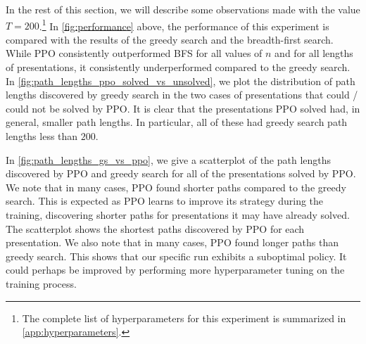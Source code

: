 In the rest of this section, we will describe some observations made with the value $T=200$.\footnote{The complete list of hyperparameters for this experiment is summarized in \autoref{app:hyperparameters}.}
In \autoref{fig:performance} above, the performance of this experiment is compared with the results of the greedy search and the breadth-first search. While PPO consistently outperformed BFS for all values of $n$ and for all lengths of presentations, it consistently underperformed compared to the greedy search. In \autoref{fig:path_lengths_ppo_solved_vs_unsolved}, we plot the distribution of path lengths discovered by greedy search in the two cases of presentations that could / could not be solved by PPO. It is clear that the presentations PPO solved had, in general, smaller path lengths. In particular, all of these had greedy search path lengths less than $200$.

In \autoref{fig:path_lengths_gs_vs_ppo}, we give a scatterplot of the path lengths discovered by PPO and greedy search for all of the presentations solved by PPO. We note that in many cases, PPO found shorter paths compared to the greedy search. This is expected as PPO learns to improve its strategy during the training, discovering shorter paths for presentations it may have already solved. The scatterplot shows the shortest paths discovered by PPO for each presentation. We also note that in many cases, PPO found longer paths than greedy search. This shows that our specific run exhibits a suboptimal policy. It could perhaps be improved by performing more hyperparameter tuning on the training process.

